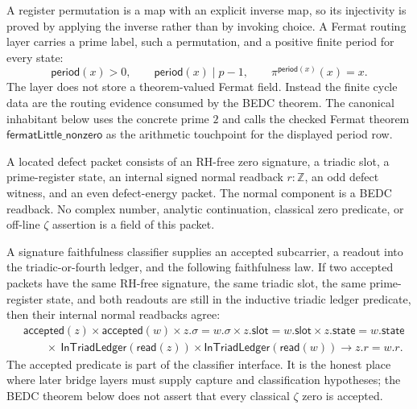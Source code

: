 \begin{definition}
\label{def:rh-prime-register-routing-tower}
A register permutation is a map with an explicit inverse map, so its
injectivity is proved by applying the inverse rather than by invoking
choice. A Fermat routing layer carries a prime label, such a permutation,
and a positive finite period for every state:
$$
\mathsf{period}(x)>0,
\qquad
\mathsf{period}(x)\mid p-1,
\qquad
\pi^{\mathsf{period}(x)}(x)=x.
$$
The layer does not store a theorem-valued Fermat field. Instead the finite
cycle data are the routing evidence consumed by the BEDC theorem. The
canonical inhabitant below uses the concrete prime $2$ and calls the
checked Fermat theorem
$
\mathsf{fermatLittle\_nonzero}
$
as the arithmetic touchpoint for the displayed period row.
\end{definition}

\begin{definition}
\label{def:rh-located-zero-signature-packet}
A located defect packet consists of an RH-free zero signature, a triadic
slot, a prime-register state, an internal signed normal readback
$r:\mathbb Z$, an odd defect witness, and an even defect-energy packet. The
normal component is a BEDC readback. No complex number, analytic
continuation, classical zero predicate, or off-line $\zeta$ assertion is a
field of this packet.
\end{definition}

\begin{definition}
\label{def:rh-signature-faithfulness-classifier}
A signature faithfulness classifier supplies an accepted subcarrier, a
readout into the triadic-or-fourth ledger, and the following faithfulness
law. If two accepted packets have the same RH-free signature, the same
triadic slot, the same prime-register state, and both readouts are still in
the inductive triadic ledger predicate, then their internal normal
readbacks agree:
$$
\begin{aligned}
&\mathsf{accepted}(z)\times\mathsf{accepted}(w)
\times z.\sigma=w.\sigma
\times z.\mathsf{slot}=w.\mathsf{slot}
\times z.\mathsf{state}=w.\mathsf{state}
\\
&\qquad
\times\ \mathsf{InTriadLedger}(\mathsf{read}(z))
\times\mathsf{InTriadLedger}(\mathsf{read}(w))
\to
z.r=w.r.
\end{aligned}
$$
The accepted predicate is part of the classifier interface. It is the
honest place where later bridge layers must supply capture and
classification hypotheses; the BEDC theorem below does not assert that
every classical $\zeta$ zero is accepted.
\end{definition}

